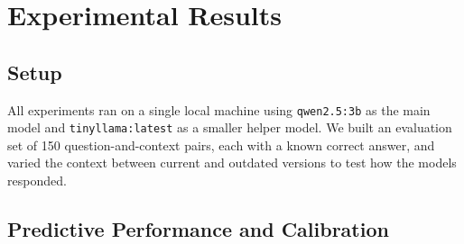 \documentclass[twoside]{article}
\begin{document}
\section{Experimental Results}

\subsection{Setup}

All experiments ran on a single local machine using \texttt{qwen2.5:3b}
as the main model and \texttt{tinyllama:latest} as a smaller helper
model. We built an evaluation set of 150 question-and-context pairs,
each with a known correct answer, and varied the context between current
and outdated versions to test how the models responded.
\vspace{-20pt} 
\subsection{Predictive Performance and Calibration}
\end{document}
